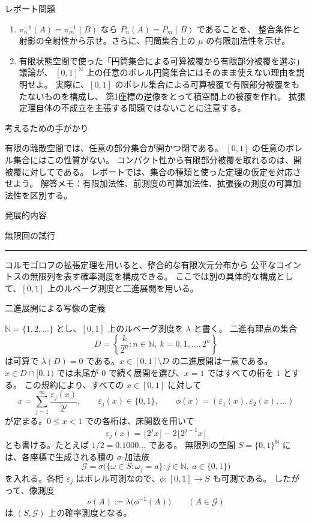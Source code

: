\documentclass[a4paper,10pt,pdflatex,ja=standard,jafont=ipaex-type1,
  magstyle=real,scale=1]{bxjsarticle}
\newcommand{\coursename}{確率論と統計学 I}
\newcommand{\topic}[1]{\par\vspace{5pt}
  {\large\sffamily\mdseries\color{accent}#1}\par\vspace{2pt}}
\newcommand{\columnheading}[1]{\par\vspace{5pt}
  {\fontsize{11pt}{15pt}\selectfont\sffamily\mdseries\color{accent}#1}\par\vspace{2pt}}
\newcommand{\columnstart}[1]{\clearpage
  \setlength{\parskip}{2.5pt}
  \fancyhead[L]{\small\color{ink}\coursename{}・発展的内容}
  {\small\sffamily\mdseries\color{accent}発展的内容}\par\vspace{4pt}
  {\Large\color{ink}#1}\par\vspace{2pt}
  {\color{accent}\rule{\linewidth}{0.7pt}}\par\vspace{4pt}}
\newcommand{\N}{\mathbb N}
\begin{document}
\topic{レポート問題}
\begin{enumerate}[label=\arabic*.]
\item $\pi_n^{-1}(A)=\pi_m^{-1}(B)$ なら $P_n(A)=P_m(B)$ であることを、
整合条件と射影の全射性から示せ。さらに、円筒集合上の $\mu$ の有限加法性を示せ。
\item 有限状態空間で使った「円筒集合による可算被覆から有限部分被覆を選ぶ」議論が、
$[0,1]^\N$ 上の任意のボレル円筒集合にはそのまま使えない理由を説明せよ。
実際に、$[0,1]$ のボレル集合による可算被覆で有限部分被覆をもたないものを構成し、
第1座標の逆像をとって積空間上の被覆を作れ。
拡張定理自体の不成立を主張する問題ではないことに注意する。
\end{enumerate}

\topic{考えるための手がかり}
有限の離散空間では、任意の部分集合が開かつ閉である。
$[0,1]$ の任意のボレル集合にはこの性質がない。
コンパクト性から有限部分被覆を取れるのは、開被覆に対してである。
レポートでは、集合の種類と使った定理の仮定を対応させよう。
\vfill
{\small\color{muted}解答メモ：有限加法性、前測度の可算加法性、拡張後の測度の可算加法性を区別する。}

\columnstart{無限回の試行}
コルモゴロフの拡張定理を用いると、整合的な有限次元分布から
公平なコイントスの無限列を表す確率測度を構成できる。
ここでは別の具体的な構成として、$[0,1]$ 上のルベーグ測度と二進展開を用いる。

\columnheading{二進展開による写像の定義}
$\N=\{1,2,\ldots\}$ とし、$[0,1]$ 上のルベーグ測度を $\lambda$ と書く。
二進有理点の集合
$$
  D=\left\{\frac{k}{2^n}:n\in\N,\ k=0,1,\ldots,2^n\right\}
$$
は可算で $\lambda(D)=0$ である。$x\in[0,1]\setminus D$ の二進展開は一意である。
$x\in D\cap[0,1)$ では末尾が $0$ で続く展開を選び、$x=1$ ではすべての桁を $1$ とする。
この規約により、すべての $x\in[0,1]$ に対して
$$
  x=\sum_{j=1}^{\infty}\frac{\varepsilon_j(x)}{2^j},\qquad
  \varepsilon_j(x)\in\{0,1\},\qquad
  \phi(x)=(\varepsilon_1(x),\varepsilon_2(x),\ldots)
$$
が定まる。$0\le x<1$ での各桁は、床関数を用いて
$$
  \varepsilon_j(x)=\lfloor2^jx\rfloor-2\lfloor2^{j-1}x\rfloor
$$
とも書ける。たとえば $1/2=0.1000\ldots$ である。
無限列の空間 $S=\{0,1\}^{\N}$ には、各座標で生成される積の $\sigma$-加法族
$$
  \mathcal G=\sigma\bigl(\{\omega\in S:\omega_j=a\}:j\in\N,\ a\in\{0,1\}\bigr)
$$
を入れる。各桁 $\varepsilon_j$ はボレル可測なので、$\phi:[0,1]\to S$ も可測である。
したがって、像測度
$$
  \nu(A):=\lambda\bigl(\phi^{-1}(A)\bigr)\qquad(A\in\mathcal G)
$$
は $(S,\mathcal G)$ 上の確率測度となる。
\end{document}
